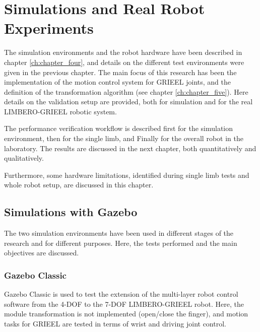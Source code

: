 \chapter{Simulations and Real Robot Experiments}
\label{ch:chapter_seven}%

The simulation environments and the robot hardware have been described in chapter \ref{ch:chapter_four}, and details on the different test environments were given in the previous chapter. 
The main focus of this research has been the implementation of the motion control system for GRIEEL joints, and the definition of the transformation algorithm (see chapter \ref{ch:chapter_five}). Here details on the validation setup are provided, both for simulation and for the real LIMBERO-GRIEEL robotic system. 

The performance verification workflow is described first for the simulation environment, then for the single limb, and Finally for the overall robot in the laboratory. 
The results are discussed in the next chapter, both quantitatively and qualitatively. 

Furthermore, some hardware limitations, identified during single limb tests and whole robot setup, are discussed in this chapter. 

\section{Simulations with Gazebo}
\label{sec:simulation}

The two simulation environments have been used in different stages of the research and for different purposes. Here, the tests performed and the main objectives are discussed. 

\subsection{Gazebo Classic}
\label{sec:gz_classic}

Gazebo Classic is used to test the extension of the multi-layer robot control software from the 4-DOF to the 7-DOF LIMBERO-GRIEEL robot. Here, the module transformation is not implemented (open/close the finger), and motion tasks for GRIEEL are tested in terms of wrist and driving joint control.

